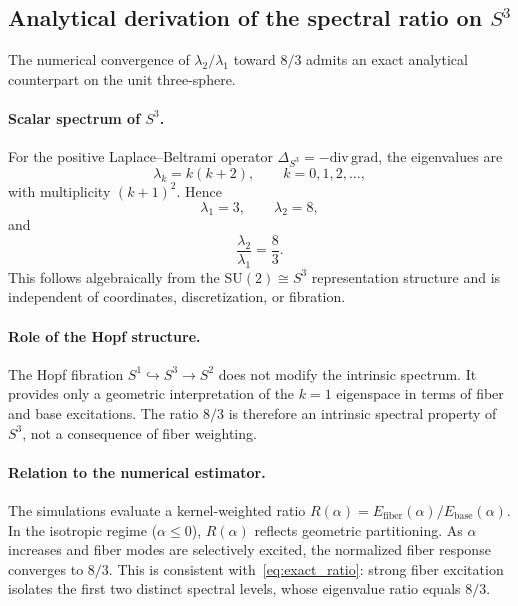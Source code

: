 \subsection{Analytical derivation of the spectral ratio on $S^3$}
  \label{sec:analytical_ratio}

  The numerical convergence of $\lambda_2/\lambda_1$ toward $8/3$
  admits an exact analytical counterpart on the unit three-sphere.

  \paragraph{Scalar spectrum of $S^3$.}
    For the positive Laplace--Beltrami operator
    $\Delta_{S^3}=-\mathrm{div}\,\mathrm{grad}$,
    the eigenvalues are~\cite{Berger1971}
    \begin{equation}
      \lambda_k = k(k+2), \qquad k=0,1,2,\ldots,
      \label{eq:S3spectrum}
    \end{equation}
    with multiplicity $(k+1)^2$.
    Hence
    \[
      \lambda_1=3, \qquad \lambda_2=8,
    \]
    and
    \begin{equation}
      \frac{\lambda_2}{\lambda_1}=\frac{8}{3}.
      \label{eq:exact_ratio}
    \end{equation}
    This follows algebraically from the $\mathrm{SU}(2)\cong S^3$
    representation structure and is independent of coordinates,
    discretization, or fibration.

  \paragraph{Role of the Hopf structure.}
    The Hopf fibration $S^1\hookrightarrow S^3\to S^2$
    does not modify the intrinsic spectrum.
    It provides only a geometric interpretation of the
    $k=1$ eigenspace in terms of fiber and base excitations.
    The ratio $8/3$ is therefore an intrinsic spectral
    property of $S^3$, not a consequence of fiber weighting.

  \paragraph{Relation to the numerical estimator.}
    The simulations evaluate a kernel-weighted ratio
    $R(\alpha)=E_{\mathrm{fiber}}(\alpha)/E_{\mathrm{base}}(\alpha)$.
    In the isotropic regime ($\alpha\le 0$), $R(\alpha)$
    reflects geometric partitioning.
    As $\alpha$ increases and fiber modes are selectively excited,
    the normalized fiber response converges to $8/3$.
    This is consistent with~\eqref{eq:exact_ratio}:
    strong fiber excitation isolates the first two distinct
    spectral levels, whose eigenvalue ratio equals $8/3$.

